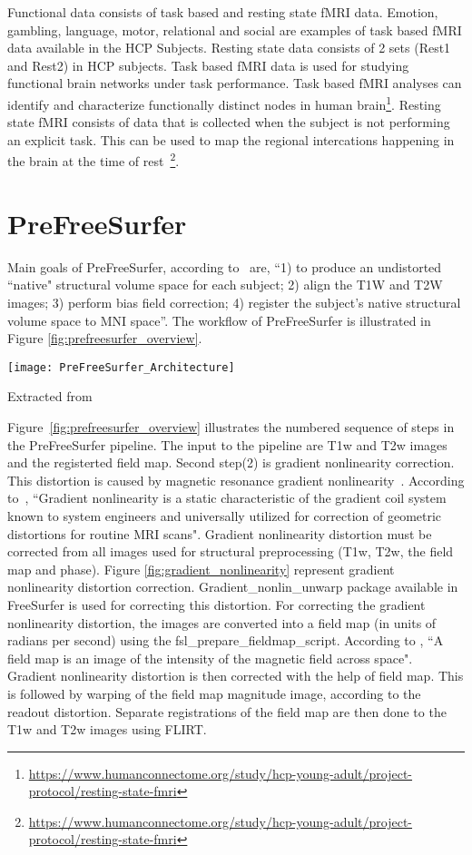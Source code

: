 Functional data consists of task based and resting state fMRI data. Emotion, gambling, language, motor, relational and social are examples of task based fMRI data available in the HCP Subjects. Resting state data consists of 2 sets (Rest1 and Rest2) in HCP subjects. Task based fMRI data is used for studying functional brain networks under task performance. Task based fMRI analyses can identify and characterize functionally distinct nodes in human brain\footnote{\url{https://www.humanconnectome.org/study/hcp-young-adult/project-protocol/resting-state-fmri}}. Resting state fMRI consists of data that is collected when the subject is not performing an explicit task. This can be used to map the regional intercations happening in the brain at the time of rest~\footnote{\url{https://www.humanconnectome.org/study/hcp-young-adult/project-protocol/resting-state-fmri}}.

\section{PreFreeSurfer} \label{sec:PrefreeSurfer}
Main goals of PreFreeSurfer, according to~\cite{Gla13} are, ``1) to produce an undistorted ``native" structural volume space for each subject; 2) align the T1W and T2W images; 3) perform bias field correction; 4) register the subject's native structural volume space to MNI space''. The workflow of PreFreeSurfer is illustrated in Figure \ref{fig:prefreesurfer_overview}.

\begin{center}
  \texttt{[image: PreFreeSurfer\_Architecture]}
  \label{fig:prefreesurfer_overview}
  \caption*{Extracted from \cite{Gla13}}
\end{center}

Figure~\ref{fig:prefreesurfer_overview} illustrates the numbered sequence of steps in the PreFreeSurfer pipeline. The input to the pipeline are T1w and T2w images and the registerted field map. Second step(2) is gradient nonlinearity correction. This distortion is caused by magnetic resonance gradient nonlinearity~\cite{Gla13}. According to~\cite{Zou2004}, ``Gradient nonlinearity is a static characteristic of the gradient coil system known to system engineers and universally utilized for correction of geometric distortions for routine MRI scans". Gradient nonlinearity distortion must be corrected from all images used for structural preprocessing (T1w, T2w, the field map and phase). Figure \ref{fig:gradient_nonlinearity} represent gradient nonlinearity distortion correction. Gradient\_nonlin\_unwarp package available in FreeSurfer is used for correcting this distortion. For correcting the gradient nonlinearity distortion, the images are converted into a field map (in units of radians per second) using the fsl\_prepare\_fieldmap\_script. According to \cite{field_map}, ``A field map is an image of the intensity of the magnetic field across space". Gradient nonlinearity distortion is then corrected with the help of field map. This is followed by warping of the field map magnitude image, according to the readout distortion. Separate registrations of the field map are then done to the T1w and T2w images using FLIRT.

